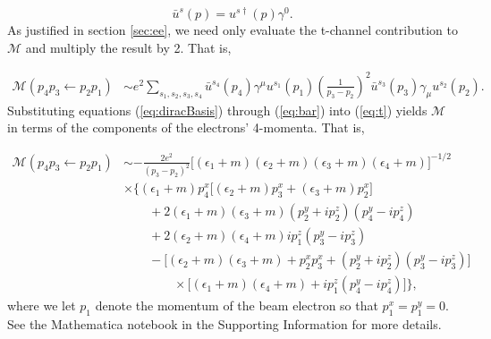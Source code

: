 \documentclass{article}
\begin{document}
\begin{equation}
  \bar{u}^s(p) = u^{s\dag}(p)\gamma^0.
  \label{eq:bar}
\end{equation}
%
As justified in section \ref{sec:ee}, we need only evaluate the t-channel
contribution to $\mathcal{M}$ and multiply the result by 2.  That is, 

\begin{equation} 
  \label{eq:t} 
  \begin{aligned} 
    \mathcal{M}(p_4p_3\leftarrow
    p_2p_1) 
    &\sim
    e^2 \sum_{s_1,s_2,s_3, s_4}
      \bar{u}^{s_4}\left(p_4\right)\gamma^{\mu}u^{s_1}\left(p_1\right)
      \left(\frac{1}{p_3 - p_2}\right)^2
      \bar{u}^{s_3}\left(p_3\right)\gamma_{\mu}u^{s_2}\left(p_2\right).
  \end{aligned} 
\end{equation}
%
Substituting equations (\ref{eq:diracBasis}) through (\ref{eq:bar}) into
(\ref{eq:t}) yields $\mathcal{M}$ in terms of the components of the electrons'
4-momenta.  That is,

\begin{equation}
\begin{aligned}
\mathcal{M}(p_4p_3\leftarrow p_2p_1)
&\sim
-\frac{2e^2}{(p_3 - p_2)^2}
\big[(\epsilon_1 + m)(\epsilon_2 + m)(\epsilon_3 + m)(\epsilon_4 + m)\big]^{-1/2}
\\&\times\Big\{
  (\epsilon_1 + m)p_4^x\big[(\epsilon_2 + m)p_3^x
    + (\epsilon_3 + m)p_2^x\big]
  \\&\qquad+
  2(\epsilon_1 + m)(\epsilon_3 + m)(p_2^y + ip_2^z)(p_4^y - ip_4^z)
  \\&\qquad+
  2(\epsilon_2 + m)(\epsilon_4 + m)ip_1^z(p_3^y - ip_3^z)
  \\&\qquad-
  \big[(\epsilon_2 + m)(\epsilon_3 + m) + p_2^xp_3^x
      + (p_2^y + ip_2^z)(p_3^y - ip_3^z)\big]
  \\&\qquad\qquad\times
  \big[(\epsilon_1 + m)(\epsilon_4 + m) + ip_1^z(p_4^y - ip_4^z)\big]
\Big\},
\end{aligned}
\end{equation}
%
where we let $p_1$ denote the momentum of the beam electron so that $p_1^x =
p_1^y = 0$.
See the Mathematica \cite{Mathematica} notebook in the Supporting Information 
for more details.

\pagebreak
\end{document}
